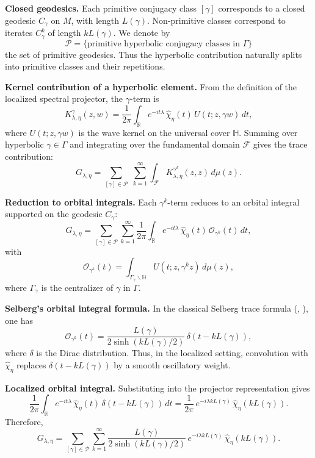 \medskip

\noindent\textbf{Closed geodesics.}
Each primitive conjugacy class $[\gamma]$ corresponds to a closed geodesic $C_\gamma$ on $M$,  
with length $L(\gamma)$.  
Non-primitive classes correspond to iterates $C_\gamma^k$ of length $kL(\gamma)$.  
We denote by
\[
  \mathcal{P} = \{\text{primitive hyperbolic conjugacy classes in }\Gamma\}
\]
the set of primitive geodesics.  
Thus the hyperbolic contribution naturally splits into primitive classes and their repetitions.

\medskip

\noindent\textbf{Kernel contribution of a hyperbolic element.}
From the definition of the localized spectral projector, the $\gamma$-term is
\[
  K_{\lambda,\eta}^\gamma(z,w)
  = \frac{1}{2\pi}\int_{\mathbb{R}} e^{-it\lambda}\,
  \widehat{\chi}_\eta(t)\, U(t; z, \gamma w)\, dt,
\]
where $U(t;z,\gamma w)$ is the wave kernel on the universal cover $\mathbb{H}$.  
Summing over hyperbolic $\gamma\in \Gamma$ and integrating over the fundamental domain $\mathcal{F}$ gives the trace contribution:
\[
  G_{\lambda,\eta} = \sum_{[\gamma]\in\mathcal{P}}\;\sum_{k=1}^\infty
  \int_{\mathcal{F}} K_{\lambda,\eta}^{\gamma^k}(z,z)\, d\mu(z).
\]

\medskip

\noindent\textbf{Reduction to orbital integrals.}
Each $\gamma^k$-term reduces to an orbital integral supported on the geodesic $C_\gamma$:
\[
  G_{\lambda,\eta}
  = \sum_{[\gamma]\in\mathcal{P}} \sum_{k=1}^\infty
  \frac{1}{2\pi}\int_{\mathbb{R}}
  e^{-it\lambda}\,\widehat{\chi}_\eta(t)\,
  \mathcal{O}_{\gamma^k}(t)\, dt,
\]
with
\[
  \mathcal{O}_{\gamma^k}(t) = \int_{\Gamma_\gamma\backslash\mathbb{H}}
  U(t; z, \gamma^k z)\, d\mu(z),
\]
where $\Gamma_\gamma$ is the centralizer of $\gamma$ in $\Gamma$.

\medskip

\noindent\textbf{Selberg’s orbital integral formula.}
In the classical Selberg trace formula (\cite{Selberg1956}, \cite{Hejhal1983}), one has
\[
  \mathcal{O}_{\gamma^k}(t) = \frac{L(\gamma)}{2\sinh(kL(\gamma)/2)}\, \delta(t-kL(\gamma)),
\]
where $\delta$ is the Dirac distribution.  
Thus, in the localized setting, convolution with $\widehat{\chi}_\eta$ replaces $\delta(t-kL(\gamma))$ by a smooth oscillatory weight.

\medskip

\noindent\textbf{Localized orbital integral.}
Substituting into the projector representation gives
\[
  \frac{1}{2\pi}\int_{\mathbb{R}} e^{-it\lambda}\,\widehat{\chi}_\eta(t)\,
  \delta(t-kL(\gamma))\, dt
  = \frac{1}{2\pi}\, e^{-i\lambda kL(\gamma)}\, \widehat{\chi}_\eta(kL(\gamma)).
\]
Therefore,
\[
  G_{\lambda,\eta}
  = \sum_{[\gamma]\in\mathcal{P}} \sum_{k=1}^\infty
  \frac{L(\gamma)}{2\sinh(kL(\gamma)/2)}\,
  e^{-i\lambda kL(\gamma)}\,
  \widehat{\chi}_\eta(kL(\gamma)).
\]

